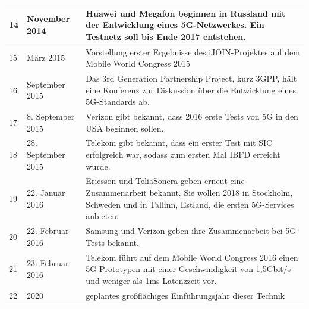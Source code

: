 \begin{tabular}{|p{1 cm}|p{3 cm}|p{13.55 cm}|}
	\hline
	14 & November 2014 & Huawei und Megafon beginnen in Russland mit der Entwicklung eines 5G-Netzwerkes. Ein Testnetz soll bis Ende 2017 entstehen. \\
	\hline
	15 & März 2015 & Vorstellung erster Ergebnisse des iJOIN-Projektes auf dem Mobile World Congress 2015 \\
	\hline
	16 & September 2015 & Das 3rd Generation Partnership Project, kurz 3GPP, hält eine Konferenz zur Diskussion über die Entwicklung eines 5G-Standards ab. \\
	\hline
	17 & 8. September 2015 & Verizon gibt bekannt, dass 2016 erste Tests von 5G in den USA beginnen sollen. \\
	\hline
	18 & 28. September 2015 & Telekom gibt bekannt, dass ein erster Test mit SIC erfolgreich war, sodass zum ersten Mal IBFD erreicht wurde. \cite{5g.2} \\
	\hline
	19 & 22. Januar 2016 & Ericsson und TeliaSonera geben erneut eine Zusammenarbeit bekannt. Sie wollen 2018 in Stockholm, Schweden und in Tallinn, Estland, die ersten 5G-Services anbieten. \\
	\hline
	20 & 22. Februar 2016 & Samsung und Verizon geben ihre Zusammenarbeit bei 5G-Tests bekannt. \\
	\hline
	21 & 23. Februar 2016 & Telekom führt auf dem Mobile World Congress 2016 einen 5G-Prototypen mit einer Geschwindigkeit von 1,5Gbit/s und weniger als 1ms Latenzzeit vor. \cite{5g.4}\\
	\hline
	22 & 2020 & geplantes großflächiges Einführungsjahr dieser Technik \\
	\hline
\end{tabular}
\par
